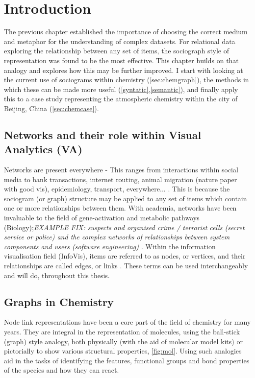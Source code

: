 
\section{Introduction}

The previous chapter established the importance of choosing the correct medium and metaphor for the understanding of complex datasets. For relational data exploring the relationship between any set of items, the sociograph style of representation was found to be the most effective. This chapter builds on that analogy and explores how this may be further improved. I start with looking at the current use of sociograms within chemistry (\autoref{sec:chemgraph}), the methods in which these can be made more useful (\autoref{syntatic},\autoref{semantic}), and finally apply this to a case study representing the atmospheric chemistry within the city of Beijing, China (\autoref{sec:chemcase}).

\subsection{Networks and their role within Visual Analytics (VA)} \label{sec:va}
Networks are present everywhere - This ranges from interactions within social media to bank transactions, internet routing, animal migration (nature paper with good vis), epidemiology, transport, everywhere... \cite{worldmap,a,b,c}. This is because the sociogram (or graph) structure may be applied to any set of items which contain one or more relationships between them. With academia, networks have been invaluable to the field of gene-activation and metabolic pathways (Biology);\textit{EXAMPLE FIX: suspects and organised crime / terrorist cells (secret service or police) and the complex networks of relationships between system components and users (software engineering) \cite{IPSEPCOLA} }. Within the information visualisation field (InfoVis), items are referred to as nodes, or vertices, and their relationships are called edges, or links \cite{ch1}. These terms can be used interchangeably and will do, throughout this thesis. 


\subsection{Graphs in Chemistry}\label{sec:chemgraph}



Node link representations have been a core part of the field of chemistry for many years. They are integral in the representation of molecules, using the ball-stick (graph) style analogy, both physically (with the aid of molecular model kits) or pictorially to show various structural properties, \autoref{fig:mol}. Using such analogies aid in the tasks of identifying the features, functional groups and bond properties of the species and how they can react.  

